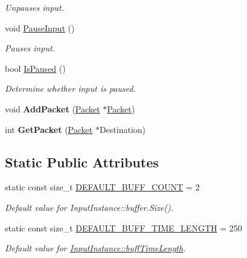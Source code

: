 \begin{DoxyCompactItemize}
\begin{DoxyCompactList}\small\item\em Unpauses input. \item\end{DoxyCompactList}\item 
void \hyperlink{class_input_instance_ace3463f9bf87b9976d97ed5b3c9a9428}{PauseInput} ()
\begin{DoxyCompactList}\small\item\em Pauses input. \item\end{DoxyCompactList}\item 
bool \hyperlink{class_input_instance_a676896d865e260935bca0550d7ec61d1}{IsPaused} ()
\begin{DoxyCompactList}\small\item\em Determine whether input is paused. \item\end{DoxyCompactList}\item 
\hypertarget{class_input_instance_a8915ed32e7eb06dbcd9b750e17743d62}{
void {\bfseries AddPacket} (\hyperlink{class_packet}{Packet} $\ast$\hyperlink{class_packet}{Packet})}
\label{class_input_instance_a8915ed32e7eb06dbcd9b750e17743d62}

\item 
\hypertarget{class_input_instance_ad5dc282c145890cbacd049e0a194a7f7}{
int {\bfseries GetPacket} (\hyperlink{class_packet}{Packet} $\ast$Destination)}
\label{class_input_instance_ad5dc282c145890cbacd049e0a194a7f7}

\end{DoxyCompactItemize}
\subsection*{Static Public Attributes}
\begin{DoxyCompactItemize}
\item 
\hypertarget{class_input_instance_a7506401c89349e0a28ab959c09a29466}{
static const size\_\-t \hyperlink{class_input_instance_a7506401c89349e0a28ab959c09a29466}{DEFAULT\_\-BUFF\_\-COUNT} = 2}
\label{class_input_instance_a7506401c89349e0a28ab959c09a29466}

\begin{DoxyCompactList}\small\item\em Default value for InputInstance::buffer.Size(). \item\end{DoxyCompactList}\item 
\hypertarget{class_input_instance_a68287bd04cc8053660fef3014f54caea}{
static const size\_\-t \hyperlink{class_input_instance_a68287bd04cc8053660fef3014f54caea}{DEFAULT\_\-BUFF\_\-TIME\_\-LENGTH} = 250}
\label{class_input_instance_a68287bd04cc8053660fef3014f54caea}

\begin{DoxyCompactList}\small\item\em Default value for \hyperlink{class_input_instance_afb8d43905f59773f07a8d07f3f70069f}{InputInstance::buffTimeLength}. \item\end{DoxyCompactList}\end{DoxyCompactItemize}

